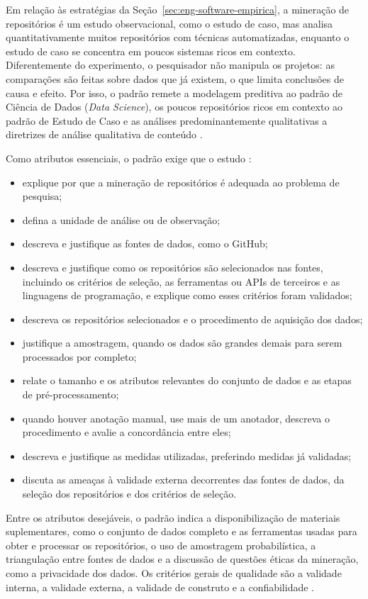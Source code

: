 Em relação às estratégias da Seção~\ref{sec:eng-software-empirica}, a mineração de repositórios é um estudo observacional, como o estudo de caso, mas analisa quantitativamente muitos repositórios com técnicas automatizadas, enquanto o estudo de caso se concentra em poucos sistemas ricos em contexto. Diferentemente do experimento, o pesquisador não manipula os projetos: as comparações são feitas sobre dados que já existem, o que limita conclusões de causa e efeito. Por isso, o padrão remete a modelagem preditiva ao padrão de Ciência de Dados (\textit{Data Science}), os poucos repositórios ricos em contexto ao padrão de Estudo de Caso e as análises predominantemente qualitativas a diretrizes de análise qualitativa de conteúdo \cite{acmsigsoft}.

Como atributos essenciais, o padrão exige que o estudo \cite{acmsigsoft}:

\begin{itemize}
    \item explique por que a mineração de repositórios é adequada ao problema de pesquisa;
    \item defina a unidade de análise ou de observação;
    \item descreva e justifique as fontes de dados, como o GitHub;
    \item descreva e justifique como os repositórios são selecionados nas fontes, incluindo os critérios de seleção, as ferramentas ou APIs de terceiros e as linguagens de programação, e explique como esses critérios foram validados;
    \item descreva os repositórios selecionados e o procedimento de aquisição dos dados;
    \item justifique a amostragem, quando os dados são grandes demais para serem processados por completo;
    \item relate o tamanho e os atributos relevantes do conjunto de dados e as etapas de pré-processamento;
    \item quando houver anotação manual, use mais de um anotador, descreva o procedimento e avalie a concordância entre eles;
    \item descreva e justifique as medidas utilizadas, preferindo medidas já validadas;
    \item discuta as ameaças à validade externa decorrentes das fontes de dados, da seleção dos repositórios e dos critérios de seleção.
\end{itemize}

Entre os atributos desejáveis, o padrão indica a disponibilização de materiais suplementares, como o conjunto de dados completo e as ferramentas usadas para obter e processar os repositórios, o uso de amostragem probabilística, a triangulação entre fontes de dados e a discussão de questões éticas da mineração, como a privacidade dos dados. Os critérios gerais de qualidade são a validade interna, a validade externa, a validade de construto e a confiabilidade \cite{acmsigsoft}.

